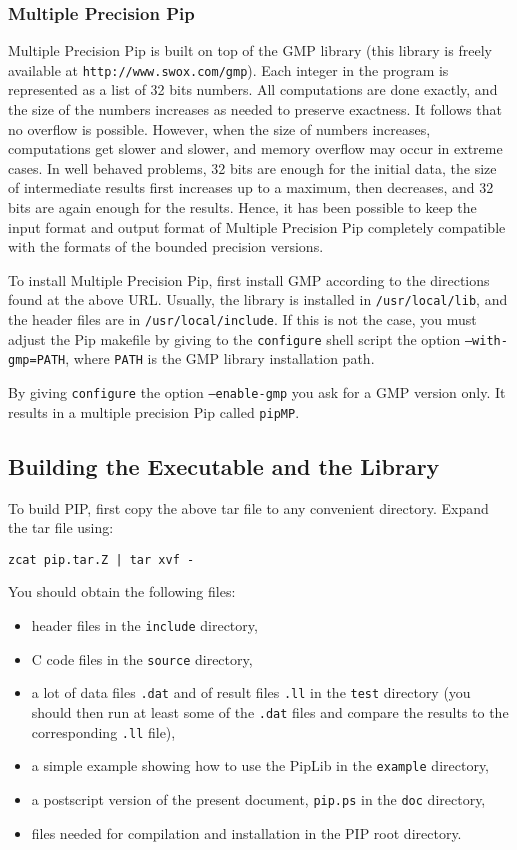 \documentclass[12pt,a4paper,dvips]{article}
\begin{document}
\subsubsection{Multiple Precision Pip}
Multiple Precision Pip is built on top of the GMP library
(this library is freely available at {\tt http://www.swox.com/gmp}). 
Each integer in the program is represented as a list of 32 bits numbers.
All computations are done exactly, and the size of the numbers increases
as needed to preserve exactness. It follows that no overflow is possible.
However, when the size of numbers increases, computations get slower and
slower, and memory overflow may occur in extreme cases. In well behaved
problems, 32 bits are enough for the initial data, the size of intermediate
results first increases up to a maximum, then decreases, and 32 bits
are again enough for the results. Hence, it has been possible to keep
the input format and output format of Multiple Precision Pip completely
compatible with the formats of the bounded precision versions.

To install Multiple Precision Pip, first install GMP according to the
directions found at the above URL. Usually, the library is installed
in {\tt /usr/local/lib}, and the header files are in {\tt /usr/local/include}.
If this is not the case, you must adjust the Pip makefile by giving
to the {\tt configure} shell script the option {\tt --with-gmp=PATH}, where
{\tt PATH} is the GMP library installation path.

By giving {\tt configure} the option {\tt --enable-gmp} you ask
for a GMP version only. It results in a multiple precision Pip
called {\tt pipMP}.


\subsection{Building the Executable and the Library}

To build PIP, first copy the above tar file to any convenient directory.
Expand the tar file using:
\begin{verbatim}
zcat pip.tar.Z | tar xvf -
\end{verbatim}
You should obtain the following files:
\begin{itemize}
\item header files in the {\tt include} directory,
\item C code files in the {\tt source} directory,
\item a lot of data files {\tt *.dat} and of result files {\tt *.ll}
      in the {\tt test} directory (you should then run at least some of
      the {\tt *.dat} files and compare the results to the corresponding
      {\tt *.ll} file),
\item a simple example showing how to use the PipLib in the {\tt example} directory,
\item a postscript version of the present document, {\tt pip.ps} in the
      {\tt doc} directory,
\item files needed for compilation and installation in the PIP
      root directory.
\end{itemize}
\end{document}
